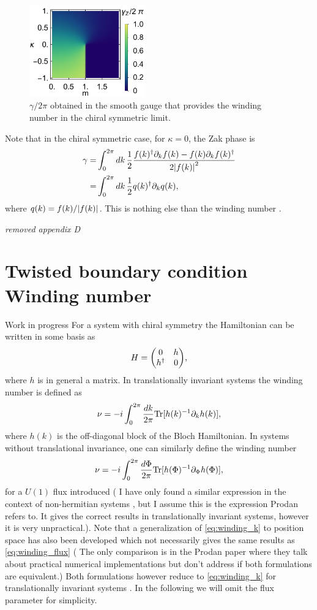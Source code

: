 \documentclass[twocolumn,amsmath,longbibliography,amssymb,superscriptaddress]{revtex4-1}
\newcommand{\carlos}[1]{{\color{red} #1}}
\newcommand{\mariac}[1]{{\it\color{cyan}#1}}
\begin{document}
\begin{figure}[t]
	\centering
	\includegraphics[width=50mm]{figApp.pdf}
	\caption{$\gamma/2\pi$ obtained in the smooth gauge that provides the winding number in the chiral symmetric limit.}
	\label{fig:ssh_zak}
\end{figure}

Note that in the chiral symmetric case, for $\kappa = 0$, the Zak phase is
\begin{align*}
\gamma =& \int_0^{2\pi} dk\,\frac{1}{2}\frac{f(k)^\dagger \partial_k f(k)-f(k)\partial_k f(k)^\dagger}{2\abs{f(k)}^2} \\
=& \int_0^{2\pi} dk\,\frac{1}{2}q(k)^\dagger \partial_k q(k),
\end{align*}
where $q(k) = f(k)/\abs{f(k)}$. This is nothing else than the winding number \cite{ryu2010topological}. 


\iffalse
\mariac{removed appendix D}
\section{Twisted boundary condition Winding number}
\carlos{Work in progress}
For a system with chiral symmetry the Hamiltonian can be written in some basis as
\begin{equation}
H = \mqty(0 & h \\ h^\dagger & 0),
\end{equation}
where $h$ is in general a matrix. In translationally invariant systems the winding number is defined as 
\begin{equation}
\nu = -i\int_0^{2\pi} \frac{dk}{2\pi} {\rm Tr}[h(k)^{-1} \partial_k h(k)],
\label{eq:winding_k}
\end{equation}
where $h(k)$ is the off-diagonal block of the Bloch Hamiltonian. In systems without translational invariance, one can similarly define the winding number
\begin{equation}
\nu = -i\int_0^{2\pi} \frac{d\Phi}{2\pi} {\rm Tr}[h(\Phi)^{-1} \partial_\Phi h(\Phi)],
\label{eq:winding_flux}
\end{equation}
for a $U(1)$ flux introduced (\carlos{I have only found a similar expression in the context of non-hermitian systems \cite{Gong2018}, but I assume this is the expression Prodan refers to. It gives the correct results in translationally invariant systems, however it is very unpractical.}). Note that a generalization of \eqref{eq:winding_k} to position space has also been developed which not necessarily gives the same results as \eqref{eq:winding_flux} (\carlos{The only comparison is in the Prodan paper where they talk about practical numerical implementations but don't address if both formulations are equivalent.}) Both formulations however reduce to \eqref{eq:winding_k} for translationally invariant systems \cite{Gong2018}.  In the following we will omit the flux parameter for simplicity.
\end{document}
